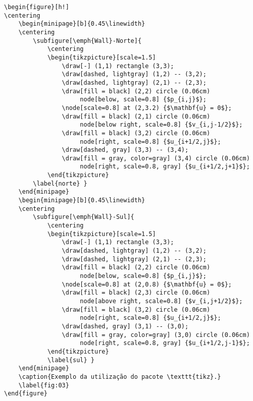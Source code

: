 \documentclass{TEMA}
\begin{document}
\begin{framed}
\begin{verbatim}
\begin{figure}[h!]
\centering
	\begin{minipage}[b]{0.45\linewidth}
	\centering
		\subfigure[\emph{Wall}-Norte]{
			\centering
			\begin{tikzpicture}[scale=1.5]
				\draw[-] (1,1) rectangle (3,3);
				\draw[dashed, lightgray] (1,2) -- (3,2);
				\draw[dashed, lightgray] (2,1) -- (2,3);
				\draw[fill = black] (2,2) circle (0.06cm) 
				     node[below, scale=0.8] {$p_{i,j}$};
				\node[scale=0.8] at (2,3.2) {$\mathbf{u} = 0$};
				\draw[fill = black] (2,1) circle (0.06cm) 
				     node[below right, scale=0.8] {$v_{i,j-1/2}$};
				\draw[fill = black] (3,2) circle (0.06cm) 
				     node[right, scale=0.8] {$u_{i+1/2,j}$};
				\draw[dashed, gray] (3,3) -- (3,4);
				\draw[fill = gray, color=gray] (3,4) circle (0.06cm)
				     node[right, scale=0.8, gray] {$u_{i+1/2,j+1}$};
			\end{tikzpicture}
		\label{norte} }
	\end{minipage}
	\begin{minipage}[b]{0.45\linewidth}
	\centering
		\subfigure[\emph{Wall}-Sul]{
			\centering
			\begin{tikzpicture}[scale=1.5]
				\draw[-] (1,1) rectangle (3,3);
				\draw[dashed, lightgray] (1,2) -- (3,2);
				\draw[dashed, lightgray] (2,1) -- (2,3);
				\draw[fill = black] (2,2) circle (0.06cm) 
				     node[below, scale=0.8] {$p_{i,j}$};
				\node[scale=0.8] at (2,0.8) {$\mathbf{u} = 0$};
				\draw[fill = black] (2,3) circle (0.06cm) 
				     node[above right, scale=0.8] {$v_{i,j+1/2}$};
				\draw[fill = black] (3,2) circle (0.06cm) 
				     node[right, scale=0.8] {$u_{i+1/2,j}$};
				\draw[dashed, gray] (3,1) -- (3,0);
				\draw[fill = gray, color=gray] (3,0) circle (0.06cm) 
				     node[right, scale=0.8, gray] {$u_{i+1/2,j-1}$};
			\end{tikzpicture}
			\label{sul} }
	\end{minipage}
	\caption{Exemplo da utilização do pacote \texttt{tikz}.}
	\label{fig:03}
\end{figure}
\end{verbatim}
\end{framed}
\end{document}
